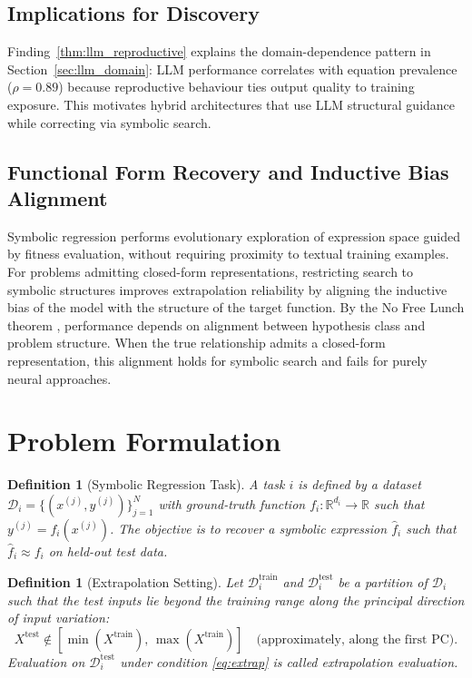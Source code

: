 \documentclass[twoside,11pt]{article}
\newtheorem{definition}[theorem]{Definition}
\begin{document}
\subsection{Implications for Discovery}

Finding~\ref{thm:llm_reproductive} explains the domain-dependence pattern in Section~\ref{sec:llm_domain}: LLM performance correlates with equation prevalence ($\rho = 0.89$) because reproductive behaviour ties output quality to training exposure. This motivates hybrid architectures that use LLM structural guidance while correcting via symbolic search.

\subsection{Functional Form Recovery and Inductive Bias Alignment}

Symbolic regression performs evolutionary exploration of expression space guided by fitness evaluation, without requiring proximity to textual training examples. For problems admitting closed-form representations, restricting search to symbolic structures improves extrapolation reliability by aligning the inductive bias of the model with the structure of the target function. By the No Free Lunch theorem \citep{wolpert1997no}, performance depends on alignment between hypothesis class and problem structure. When the true relationship admits a closed-form representation, this alignment holds for symbolic search and fails for purely neural approaches.

\section{Problem Formulation}
\label{sec:problem}

\begin{definition}[Symbolic Regression Task]
A task $i$ is defined by a dataset $\mathcal{D}_i = \{(x^{(j)}, y^{(j)})\}_{j=1}^{N}$
with ground-truth function $f_i: \mathbb{R}^{d_i} \to \mathbb{R}$ such that
$y^{(j)} = f_i(x^{(j)})$.  The objective is to recover a symbolic expression
$\hat{f}_i$ such that $\hat{f}_i \approx f_i$ on held-out test data.
\end{definition}

\begin{definition}[Extrapolation Setting]
Let $\mathcal{D}^{\mathrm{train}}_i$ and $\mathcal{D}^{\mathrm{test}}_i$ be a
partition of $\mathcal{D}_i$ such that the test inputs lie beyond the training range
along the principal direction of input variation:
\begin{equation}
  X^{\mathrm{test}} \notin [\min(X^{\mathrm{train}}),\, \max(X^{\mathrm{train}})]
  \quad \text{(approximately, along the first PC)}.
  \label{eq:extrap}
\end{equation}
Evaluation on $\mathcal{D}^{\mathrm{test}}_i$ under condition \eqref{eq:extrap}
is called \emph{extrapolation evaluation}.
\end{definition}
\end{document}
